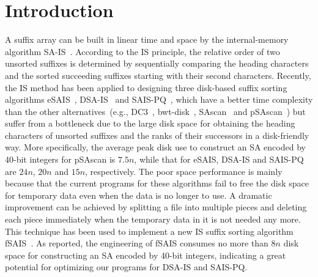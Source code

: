 \documentclass[10pt,journal,compsoc]{IEEEtran}
\begin{document}
\IEEEdisplaynontitleabstractindextext

\IEEEpeerreviewmaketitle

\section{Introduction}\label{sec:introduction}

A suffix array can be built in linear time and space by the internal-memory algorithm SA-IS~\cite{Nong11}. According to the IS principle, the relative order of two unsorted suffixes is determined by sequentially comparing the heading characters and the sorted succeeding suffixes starting with their second characters. Recently, the IS method has been applied to designing three disk-based suffix sorting algorithms eSAIS~\cite{Bingmann12}, DSA-IS~\cite{Nong15} and SAIS-PQ~\cite{Liu15}, which have a better time complexity than the other alternatives~(e.g., DC3~\cite{Dementiev2008a}, bwt-disk~\cite{Ferragina2012}, SAscan~\cite{Karkkainen2014} and pSAscan~\cite{Karkkainen2015}) but suffer from a bottleneck due to the large disk space for obtaining the heading characters of unsorted suffixes and the ranks of their successors in a disk-friendly way. More specifically, the average peak disk use to construct an SA encoded by 40-bit integers for pSAscan is $7.5n$, while that for eSAIS, DSA-IS and SAIS-PQ are $24n$, $20n$ and $15n$, respectively. The poor space performance is mainly because that the current programs for these algorithms fail to free the disk space for temporary data even when the data is no longer to use. A dramatic improvement can be achieved by splitting a file into multiple pieces and deleting each piece immediately when the temporary data in it is not needed any more. This technique has been used to implement a new IS suffix sorting algorithm fSAIS~\cite{Karkkainen2017}. As reported, the engineering of fSAIS consumes no more than $8n$ disk space for constructing an SA encoded by 40-bit integers, indicating a great potential for optimizing our programs for DSA-IS and SAIS-PQ.
\end{document}
